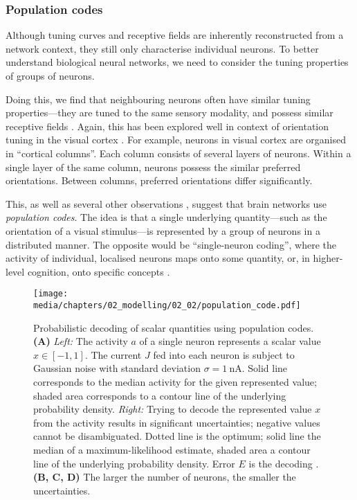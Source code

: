 \subsubsection{Population codes}
Although tuning curves and receptive fields are inherently reconstructed from a network context, they still only characterise individual neurons.
To better understand biological neural networks, we need to consider the tuning properties of groups of neurons.

Doing this, we find that neighbouring neurons often have similar tuning properties---they are tuned to the same sensory modality, and possess similar receptive fields \citep{berkowitz2009population}.
Again, this has been explored well in context of orientation tuning in the visual cortex \citep[Chapter~25]{kandel2012principles}.
For example, neurons in visual cortex are organised in \enquote{cortical columns}.
Each column consists of several layers of neurons.
Within a single layer of the same column, neurons possess the similar preferred orientations.
Between columns, preferred orientations differ significantly.

This, as well as several other observations \citep{yuste2015neuron}, suggest that brain networks use \emph{population codes}.
The idea is that a single underlying quantity---such as the orientation of a visual stimulus---is represented by a group of neurons in a distributed manner.
The opposite would be \enquote{single-neuron coding}, where the activity of individual, localised neurons maps onto some quantity, or, in higher-level cognition, onto specific concepts \citep{berkowitz2009population}.

\begin{figure}
	\centering
	\texttt{[image: media/chapters/02\_modelling/02\_02/population\_code.pdf]}
	\caption[Probabilistic decoding of scalar quantities using population codes]{Probabilistic decoding of scalar quantities using population codes.
	\textbf{(A)} \emph{Left:} The activity $a$ of a single neuron represents a scalar value $x \in [-1, 1]$.
	The current $J$ fed into each neuron is subject to Gaussian noise with standard deviation $\sigma = \SI{1}{\nano\ampere}$.
	Solid line corresponds to the median activity for the given represented value; shaded area corresponds to a contour line of the underlying probability density.
	\emph{Right:} Trying to decode the represented value $x$ from the activity results in significant uncertainties; negative values cannot be disambiguated. Dotted line is the optimum; solid line the median of a maximum-likelihood estimate, shaded area a contour line of the underlying probability density.
	Error $E$ is the decoding \RMSE.
	\textbf{(B, C, D)} The larger the number of neurons, the smaller the uncertainties.}
	\label{fig:population_code}
\end{figure}

